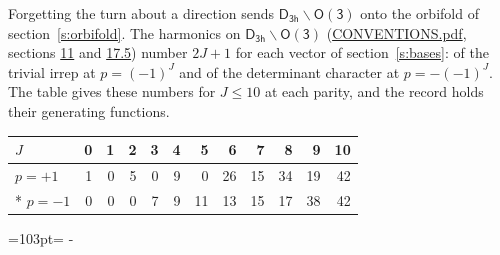 \documentclass[10pt,a4paper]{article}
\newcommand{\needspace}[1]{\par\penalty-100\begingroup\dimen0=#1\relax\dimen2=\pagegoal
  \advance\dimen2-\pagetotal\ifdim\dimen0>\dimen2\relax\ifdim\dimen2>0pt\vfil\break\fi\fi
  \endgroup}
\numberwithin{equation}{section}
\newcommand{\grp}[1]{\mathsf{#1}}
\begin{document}
Forgetting the turn about a direction sends $\grp{D_{3h}}\backslash\grp{O(3)}$ onto the orbifold of section~\ref{s:orbifold}.
The harmonics on $\grp{D_{3h}}\backslash\grp{O(3)}$ (\href{../../CONVENTIONS.pdf}{CONVENTIONS.pdf}, sections \href{../../CONVENTIONS.pdf\#conv.11}{11} and \href{../../CONVENTIONS.pdf\#conv.17.5}{17.5}) number $2J + 1$ for each vector of section~\ref{s:bases}: of the trivial irrep at $p = (-1)^J$ and of the determinant character at $p = -(-1)^J$. The table gives these numbers for $J \le 10$ at each parity, and the record holds their generating functions.
{\small\setlength{\tabcolsep}{4pt}\begin{longtable}{@{}lrrrrrrrrrrr@{}}\toprule
$J$ & 0 & 1 & 2 & 3 & 4 & 5 & 6 & 7 & 8 & 9 & 10\\\midrule\endhead
\bottomrule\endfoot\endlastfoot
$p = +1$ & 1 & 0 & 5 & 0 & 9 & 0 & 26 & 15 & 34 & 19 & 42\\*
$p = -1$ & 0 & 0 & 0 & 7 & 9 & 11 & 13 & 15 & 17 & 38 & 42\\
\bottomrule\end{longtable}}
\needspace{103pt}
\end{document}
